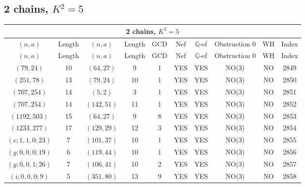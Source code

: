 \subsection{2 chains, $K^2 = 5$}
\begin{longtable}{|c|c|c|c|c|c|c|c|c|c|}
\hline
\multicolumn{10}{|c|}{2 chains, $K^2 = 5$}\\
\hline
$(n,a)$ & Length & $(n,a)$ & Length & GCD & Nef & $\mathbb Q$-ef & Obstruction 0 & WH & Index\\
\hline
\endfirsthead

\hline
$(n,a)$ & Length & $(n,a)$ & Length & GCD & Nef & $\mathbb Q$-ef & Obstruction 0 & WH & Index\\
\hline
\endhead
\hline
\endfoot

$(79, 24)$ & 10 & $(64, 27)$ & 9 & 1 & YES & YES & NO(3) & NO & 2849\\
$(251, 78)$ & 13 & $(79, 24)$ & 10 & 1 & YES & YES & NO(3) & NO & 2850\\
$(707, 254)$ & 14 & $(5, 2)$ & 3 & 1 & YES & YES & NO(3) & NO & 2851\\
$(707, 254)$ & 14 & $(142, 51)$ & 11 & 1 & YES & YES & NO(3) & NO & 2852\\
$(1192, 503)$ & 15 & $(64, 27)$ & 9 & 8 & YES & YES & NO(3) & NO & 2853\\
$(1233, 277)$ & 17 & $(129, 29)$ & 12 & 3 & YES & YES & NO(3) & NO & 2854\\
$(e; 1, 1, 0; 23)$ & 7 & $(101, 37)$ & 10 & 1 & YES & YES & NO(3) & NO & 2855\\
$(g; 0, 0, 0; 19)$ & 6 & $(119, 44)$ & 10 & 1 & YES & YES & NO(3) & NO & 2856\\
$(g; 0, 0, 1; 26)$ & 7 & $(106, 41)$ & 10 & 2 & YES & YES & NO(3) & NO & 2857\\
$(i; 0, 0, 0; 9)$ & 5 & $(351, 80)$ & 13 & 9 & YES & YES & NO(3) & NO & 2858
\end{longtable}
